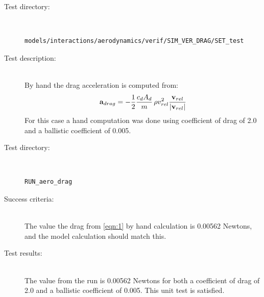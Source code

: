 \label{test:sd}
\begin{description}
\item[Test directory:] \
\begin{verbatim}models/interactions/aerodynamics/verif/SIM_VER_DRAG/SET_test\end{verbatim}
\item[Test description:] \ \\
By hand the drag acceleration is computed from:
\begin{equation}
{\bf{a}}_{drag} = - \frac{1}{2}\frac{{c_d A_d }}{m}\,\rho v^2 _{rel} \frac{{{\bf{v}}_{rel} }}{{\left| {{\bf{v}}_{rel} } \right|}}\label{eqn:1}
\end{equation}
For this case a hand
computation was done using coefficient of drag of 2.0 and a ballistic
coefficient of 0.005.
\item[Test directory:] \
\begin{verbatim}RUN_aero_drag\end{verbatim}
\item[Success criteria:] \ \\
The value the drag from \ref{eqn:1} by hand calculation is 0.00562 Newtons,
and the model calculation should match this.
\item[Test results:] \ \\
The value from the run is 0.00562 Newtons for both a coefficient of drag of
2.0 and a ballistic coefficient of 0.005.  This unit test is satisfied.
\end{description}

